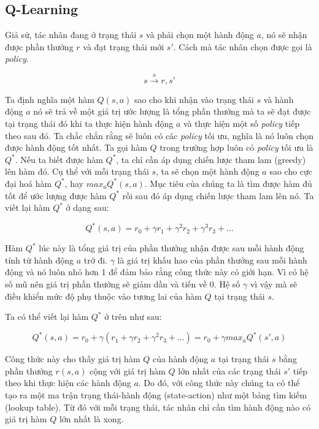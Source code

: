 \subsection{Q-Learning}
Giả sử, tác nhân đang ở trạng thái $s$ và phải chọn một hành động $a$, nó sẽ nhận được phần thưởng $r$ và đạt trạng thái mới $s'$. Cách mà tác nhân chọn được gọi là \textit{policy}.

\begin{equation*}
    s \xrightarrow{\text{a}} r,s'
\end{equation*}

Ta định nghĩa một hàm $Q(s,a)$ sao cho khi nhận vào trạng thái $s$ và hành động $a$ nó sẽ trả về một giá trị ước lượng là tổng phần thưởng mà ta sẽ đạt được tại trạng thái đó khi ta thực hiện hành động $a$ và thực hiện một số \textit{policy} tiếp theo sau đó. Ta chắc chắn rằng sẽ luôn có các \textit{policy} tối ưu, nghĩa là nó luôn chọn được hành động tốt nhất. Ta gọi hàm $Q$ trong trường hợp luôn có \textit{policy} tối ưu là $Q^*$. Nếu ta biết được hàm $Q^*$, ta chỉ cần áp dụng chiến lược tham lam (greedy) lên hàm đó. Cụ thể với mỗi trạng thái $s$, ta sẽ chọn một hành động $a$ sao cho cực đại hoá hàm $Q^*$, hay ${max_a}{Q^*}(s,a)$. Mục tiêu của chúng ta là tìm được hàm đủ tốt để ước lượng được hàm $Q^*$ rồi sau đó áp dụng chiến lược tham lam lên nó. Ta viết lại hàm $Q^*$ ở dạng sau:

\begin{equation*}
    Q^*(s,a) = r_0 + {\gamma}r_1 + {\gamma}^{2}r_2 + {\gamma}^{3}r_3 + ...
\end{equation*}

Hàm $Q^*$ lúc này là tổng giá trị của phần thưởng nhận được sau mỗi hành động tính từ hành động $a$ trở đi. $\gamma$ là giá trị khấu hao của phần thưởng sau mỗi hành động và nó luôn nhỏ hơn 1 để đảm bảo rằng công thức này có giới hạn. Vì có hệ số mũ nên giá trị phần thưởng sẽ giảm dần và tiến về 0. Hệ số $\gamma$ vì vậy mà sẽ điều khiển mức độ phụ thuộc vào tương lai của hàm $Q$ tại trạng thái $s$.\newline

Ta có thể viết lại hàm $Q^*$ ở trên như sau:

\begin{equation*}
    Q^*(s,a) = r_0 + {\gamma}(r_1 + {\gamma}r_2 + {\gamma}^{2}r_3 + ...) = r_0 + {\gamma}max_{a}Q^{*}(s',a)
\end{equation*}

Công thức này cho thấy giá trị hàm $Q$ của hành động $a$ tại trạng thái $s$ bằng phần thưởng $r(s,a)$ cộng với giá trị hàm $Q$ lớn nhất của các trạng thái $s'$ tiếp theo khi thực hiện các hành động $a$. Do đó, với công thức này chúng ta có thể tạo ra một ma trận trạng thái-hành động (state-action) như một bảng tìm kiếm (lookup table). Từ đó với mỗi trạng thái, tác nhân chỉ cần tìm hành động nào có giá trị hàm $Q$ lớn nhất là xong.\newline

